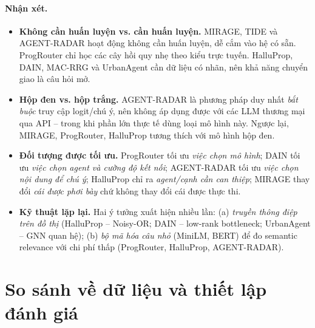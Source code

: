 \paragraph{Nhận xét.}
\begin{itemize}
  \item \textbf{Không cần huấn luyện vs. cần huấn luyện.} MIRAGE, TIDE và AGENT-RADAR hoạt động không cần huấn luyện, dễ cắm vào hệ có sẵn. ProgRouter chỉ học các cây hồi quy nhẹ theo kiểu trực tuyến. HalluProp, DAIN, MAC-RRG và UrbanAgent cần dữ liệu có nhãn, nên khả năng chuyển giao là câu hỏi mở.
  \item \textbf{Hộp đen vs. hộp trắng.} AGENT-RADAR là phương pháp duy nhất \emph{bắt buộc} truy cập logit/chú ý, nên không áp dụng được với các LLM thương mại qua API -- trong khi phần lớn \MAS{} thực tế dùng loại mô hình này. Ngược lại, MIRAGE, ProgRouter, HalluProp tương thích với mô hình hộp đen.
  \item \textbf{Đối tượng được tối ưu.} ProgRouter tối ưu \emph{việc chọn mô hình}; DAIN tối ưu \emph{việc chọn agent và cường độ kết nối}; AGENT-RADAR tối ưu \emph{việc chọn nội dung để chú ý}; HalluProp chỉ ra \emph{agent/cạnh cần can thiệp}; MIRAGE thay đổi \emph{cái được phơi bày} chứ không thay đổi cái được thực thi.
  \item \textbf{Kỹ thuật lặp lại.} Hai ý tưởng xuất hiện nhiều lần: (a) \emph{truyền thông điệp trên đồ thị} (HalluProp -- Noisy-OR; DAIN -- low-rank bottleneck; UrbanAgent -- GNN quan hệ); (b) \emph{bộ mã hóa câu nhỏ} (MiniLM, BERT) để đo semantic relevance với chi phí thấp (ProgRouter, HalluProp, AGENT-RADAR).
\end{itemize}

\section{So sánh về dữ liệu và thiết lập đánh giá}
\label{sec:cmp-data}


